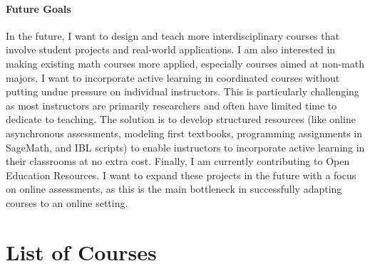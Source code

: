 \documentclass[
]{report}
\begin{document}
\hypertarget{future-goals}{%
\subsubsection*{Future Goals}\label{future-goals}}


In the future, I want to design and teach more interdisciplinary courses that involve student projects and real-world applications.
I am also interested in making existing math courses more applied, especially courses aimed at non-math majors.
I want to incorporate active learning in coordinated courses without putting undue pressure on individual instructors.
This is particularly challenging as most instructors are primarily researchers and often have limited time to dedicate to teaching.
The solution is to develop structured resources (like online asynchronous assessments, modeling first textbooks, programming assignments in SageMath, and IBL scripts) to enable instructors to incorporate active learning in their classrooms at no extra cost.
Finally, I am currently contributing to Open Education Resources. I want to expand these projects in the future with a focus on online assessments, as this is the main bottleneck in successfully adapting courses to an online setting.

\hypertarget{list-of-courses}{%
\chapter{List of Courses}\label{list-of-courses}}
\end{document}
